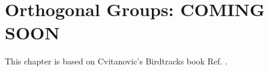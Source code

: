 \chapter{Orthogonal Groups: COMING SOON}
\label{ch-ortho-groups}
This chapter is based on Cvitanovic's Birdtracks book Ref. \cite{birdtracks-book}.